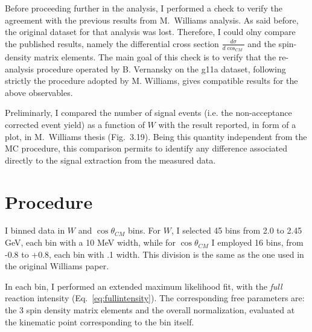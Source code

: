 \documentclass[a4paper,10pt]{report}
\begin{document}
Before proceeding further in the analysis, I performed a check to verify the agreement with the previous results from M.~Williams analysis. 
As said before, the original dataset for that analysis was lost. Therefore, I could olny compare the published results, namely the differential cross section $\frac{d\sigma}{d\cos_{CM}}$ and the spin-density matrix elements.
The main goal of this check is to verify that the re-analysis procedure operated by B. Vernansky on the g11a dataset, following strictly the procedure adopted by M. Williams, gives compatible results for the above observables.

Preliminarly, I compared the number of signal events (i.e. the non-acceptance corrected event yield) as a function of $W$ with the result reported, in form of a plot, in M.~Williams thesis (Fig.~3.19). Being this quantity independent from the MC procedure,
this comparison permits to identify any difference associated directly to the signal extraction from the measured data.


\section{Procedure}
I binned data in $W$ and $\cos \theta_{CM}$ bins. For $W$, I selected 45 bins from 2.0 to 2.45 GeV, each bin with a 10 MeV width, while for  $\cos \theta_{CM}$ I employed 16 bins, from -0.8 to +0.8, each bin with .1 width. This division is the 
same as the one used in the original Williams paper. 

In each bin, I performed an extended maximum likelihood fit, with the \textit{full} reaction intensity (Eq.~\ref{eq:fullintensity}). 
The corresponding free parameters are: the 3 spin density matrix elements and the overall normalization, evaluated at the kinematic point corresponding to the bin itself.
\end{document}
